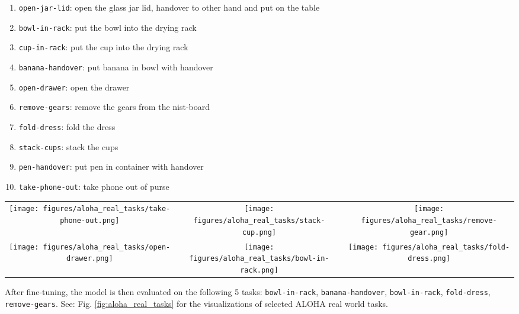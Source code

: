 \begin{enumerate}
    \item[1.] \texttt{open-jar-lid}: open the glass jar lid, handover to other hand and put on the table
    \item[2.] \texttt{bowl-in-rack}: put the bowl into the drying rack
    \item[3.] \texttt{cup-in-rack}: put the cup into the drying rack
    \item[4.] \texttt{banana-handover}: put banana in bowl with handover
    \item[5.] \texttt{open-drawer}: open the drawer
    \item[6.] \texttt{remove-gears}: remove the gears from the nist-board
    \item[7.] \texttt{fold-dress}: fold the dress
    \item[8.] \texttt{stack-cups}: stack the cups
    \item[9.] \texttt{pen-handover}: put pen in container with handover
    \item[10.] \texttt{take-phone-out}: take phone out of purse
\end{enumerate}

\begin{figure*}
\centering
\setlength\tabcolsep{2pt}%
\begin{tabular}{ccc}
\texttt{[image: figures/aloha\_real\_tasks/take-phone-out.png]} & \texttt{[image: figures/aloha\_real\_tasks/stack-cup.png]} & \texttt{[image: figures/aloha\_real\_tasks/remove-gear.png]} \\
 \texttt{[image: figures/aloha\_real\_tasks/open-drawer.png]} &   \texttt{[image: figures/aloha\_real\_tasks/bowl-in-rack.png]} & \texttt{[image: figures/aloha\_real\_tasks/fold-dress.png]} \\
\end{tabular}
\label{fig:aloha_real_tasks}
\end{figure*}

After fine-tuning, the model is then evaluated on the following 5 tasks: \texttt{bowl-in-rack}, \texttt{banana-handover}, \texttt{bowl-in-rack}, \texttt{fold-dress}, \texttt{remove-gears}. See: Fig. \ref{fig:aloha_real_tasks} for the visualizations of selected ALOHA real world tasks.


